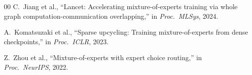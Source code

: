 \documentclass[conference]{IEEEtran}
\begin{document}
\begin{thebibliography}{00}
C.~Jiang et al., ``Lancet: Accelerating mixture-of-experts training via whole graph computation-communication overlapping,'' in \textit{Proc.\ MLSys}, 2024.

A.~Komatsuzaki et al., ``Sparse upcycling: Training mixture-of-experts from dense checkpoints,'' in \textit{Proc.\ ICLR}, 2023.

Z.~Zhou et al., ``Mixture-of-experts with expert choice routing,'' in \textit{Proc.\ NeurIPS}, 2022.

\end{thebibliography}

\end{document}
